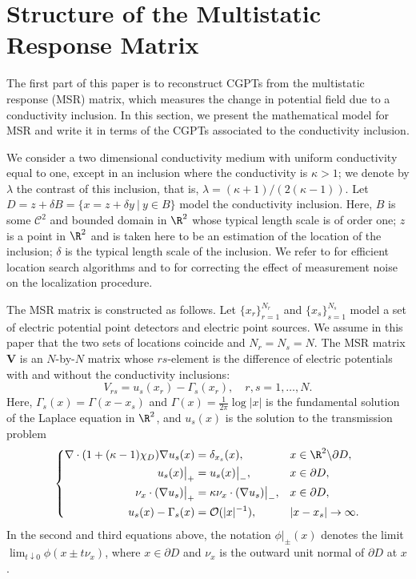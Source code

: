 \section{Structure of the Multistatic Response Matrix}\label{sec:struct-mult-resp}

The first part of this paper is to reconstruct CGPTs from the
multistatic response  (MSR) matrix, which measures the change in
potential field due to a conductivity inclusion. In this section,
we present the mathematical model for MSR and write it in terms of
the CGPTs associated to the conductivity inclusion.

We consider a two dimensional conductivity medium with uniform
conductivity equal to one, except in an inclusion where the
conductivity is $\kappa
> 1$; we denote by $\lambda$ the contrast of this inclusion, that
is,  $\lambda = (\kappa + 1)/(2(\kappa - 1))$. Let $D = z + \delta
B = \{ x = z + \delta y ~|~ y \in B\}$ model the conductivity
inclusion.  Here, $B$ is some $\mathcal{C}^2$ and bounded domain
in $\R^2$ whose typical length scale is of order one; $z$ is a
point in $\R^2$ and is taken here to be an estimation of the
location of the inclusion; $\delta$ is the typical length scale of
the inclusion. We refer to \cite{ammari2004reconstruction} for efficient location
search algorithms and to \cite{AGJ} for correcting the effect of
measurement noise on the localization procedure.

The MSR matrix is constructed as follows. Let
$\{x_r\}_{r=1}^{N_r}$ and $\{x_s\}_{s=1}^{N_s}$ model a set of
electric potential point detectors and electric point sources. We
assume in this paper that the two sets of locations coincide and
$N_r = N_s = N$. The MSR matrix $\mathbf{V}$ is an $N$-by-$N$
matrix whose $rs$-element is the difference of electric potentials
with and without the conductivity inclusions:
\begin{equation}
V_{rs} = u_s(x_r) - \Gamma_s(x_r), \quad r, s = 1, \ldots, N.
\end{equation}
Here, $\Gamma_s (x) = \Gamma(x-x_s)$ and $\Gamma(x) =
\frac{1}{2\pi} \log |x|$ is the fundamental solution of the
Laplace equation in $\R^2$, and $u_s(x)$ is the solution to the
transmission problem
\begin{equation}
\left\{
\begin{aligned}
\nabla \cdot (1 + (\kappa-1) \chi_{D}) \nabla u_s(x) &= \delta_{x_s}(x),  & & x \in \R^2 \backslash \partial D,\\
u_s (x) \big|_{+} &= u_s (x) \big|_{-}, & & x \in \partial D,\\
\nu_x \cdot (\nabla u_s) \big|_{+} &= \kappa \nu_x \cdot (\nabla u_s) \big|_{-}, & & x \in \partial D,\\
u_s(x) - \Gamma_s (x) & = \mathcal{O}(|x|^{-1}), & & |x-x_s| \to
\infty.
\end{aligned}
\right. \label{eq:transm}
\end{equation}
In the second and third equations above, the notation
$\phi\big|_{\pm}(x)$ denotes the limit $\lim_{t \downarrow 0}
\phi(x\pm t\nu_x)$, where $x \in \partial D$ and $\nu_x$ is the
outward unit normal of $\partial D$ at $x$.

